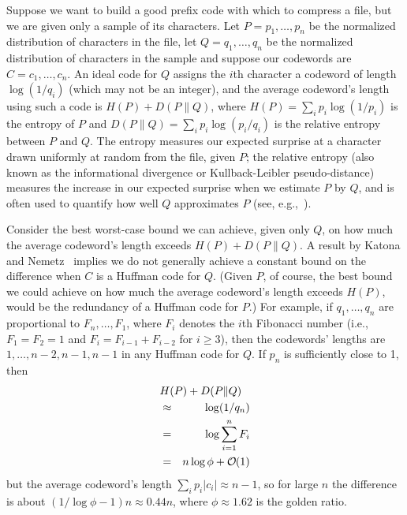 \documentclass[runningheads]{llncs}
\newcommand{\Oh}[1]
    {\ensuremath{\mathcal{O} \hspace{-.5ex} \left( {#1} \right)}}
\begin{document}
Suppose we want to build a good prefix code with which to compress a file, but we are given only a sample of its characters.  Let \(P = p_1, \ldots, p_n\) be the normalized distribution of characters in the file, let \(Q = q_1, \ldots, q_n\) be the normalized distribution of characters in the sample and suppose our codewords are \(C = c_1, \ldots, c_n\).  An ideal code for $Q$ assigns the $i$th character a codeword of length \(\log (1 / q_i)\) (which may not be an integer), and the average codeword's length using such a code is \(H (P) + D (P \| Q)\), where \(H (P) = \sum_i p_i \log (1 / p_i)\) is the entropy of $P$ and \(D (P \| Q) = \sum_i p_i \log (p_i / q_i)\) is the relative entropy between $P$ and $Q$.  The entropy measures our expected surprise at a character drawn uniformly at random from the file, given $P$; the relative entropy (also known as the informational divergence or Kullback-Leibler pseudo-distance) measures the increase in our expected surprise when we estimate $P$ by $Q$, and is often used to quantify how well $Q$ approximates $P$ (see, e.g.,~\cite{CT06}).

Consider the best worst-case bound we can achieve, given only $Q$, on how much the average codeword's length exceeds \(H (P) + D (P \| Q)\).  A result by Katona and Nemetz~\cite{KN76} implies we do not generally achieve a constant bound on the difference when $C$ is a Huffman code for $Q$.  (Given $P$, of course, the best bound we could achieve on how much the average codeword's length exceeds \(H (P)\), would be the redundancy of a Huffman code for $P$.)  For example, if \(q_1, \ldots, q_n\) are proportional to \(F_n, \ldots, F_1\), where $F_i$ denotes the $i$th Fibonacci number (i.e., \(F_1 = F_2 = 1\) and \(F_i = F_{i - 1} + F_{i - 2}\) for \(i \geq 3\)), then the codewords' lengths are \(1, \ldots, n - 2, n - 1, n - 1\) in any Huffman code for $Q$.  If $p_n$ is sufficiently close to 1, then
\begin{eqnarray*}
\lefteqn{H (P) + D (P \| Q)}\\
& \approx & \log (1 / q_n)\\
& = & \log \sum_{i = 1}^n F_i\\
& = & n \log \phi + \Oh{1}
\end{eqnarray*}
but the average codeword's length \(\sum_i p_i |c_i| \approx n - 1\), so for large $n$ the difference is about \((1 / \log \phi - 1) n \approx 0.44 n\), where \(\phi \approx 1.62\) is the golden ratio.
\end{document}
